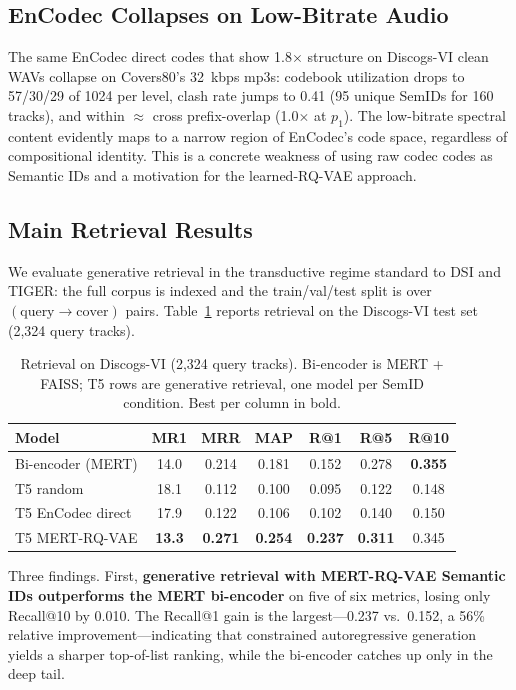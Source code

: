 \documentclass[conference]{IEEEtran}
\begin{document}
\subsection{EnCodec Collapses on Low-Bitrate Audio}
The same EnCodec direct codes that show 1.8$\times$ structure on Discogs-VI clean WAVs collapse on Covers80's 32~kbps mp3s: codebook utilization drops to 57/30/29 of 1024 per level, clash rate jumps to 0.41 (95 unique SemIDs for 160 tracks), and within $\approx$ cross prefix-overlap (1.0$\times$ at $p_1$). The low-bitrate spectral content evidently maps to a narrow region of EnCodec's code space, regardless of compositional identity. This is a concrete weakness of using raw codec codes as Semantic IDs and a motivation for the learned-RQ-VAE approach.

\subsection{Main Retrieval Results}
We evaluate generative retrieval in the transductive regime standard to DSI and TIGER: the full corpus is indexed and the train/val/test split is over $(\text{query}\rightarrow\text{cover})$ pairs. Table~\ref{tab:main_results} reports retrieval on the Discogs-VI test set (2{,}324 query tracks).

\begin{table}[t]
\caption{Retrieval on Discogs-VI (2{,}324 query tracks). Bi-encoder is MERT + FAISS; T5 rows are generative retrieval, one model per SemID condition. Best per column in bold.}
\label{tab:main_results}
\centering
\small
\setlength{\tabcolsep}{3.7pt}
\begin{tabular}{lcccccc}
\toprule
Model & MR1 & MRR & MAP & R@1 & R@5 & R@10 \\
\midrule
Bi-encoder (MERT)    & 14.0 & 0.214 & 0.181 & 0.152 & 0.278 & \textbf{0.355} \\
T5 random            & 18.1 & 0.112 & 0.100 & 0.095 & 0.122 & 0.148 \\
T5 EnCodec direct    & 17.9 & 0.122 & 0.106 & 0.102 & 0.140 & 0.150 \\
T5 MERT-RQ-VAE       & \textbf{13.3} & \textbf{0.271} & \textbf{0.254} & \textbf{0.237} & \textbf{0.311} & 0.345 \\
\bottomrule
\end{tabular}
\end{table}

Three findings. First, \textbf{generative retrieval with MERT-RQ-VAE Semantic IDs outperforms the MERT bi-encoder} on five of six metrics, losing only Recall@10 by 0.010. The Recall@1 gain is the largest---0.237 vs.\ 0.152, a 56\% relative improvement---indicating that constrained autoregressive generation yields a sharper top-of-list ranking, while the bi-encoder catches up only in the deep tail.
\end{document}

